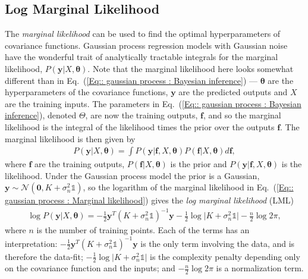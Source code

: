 \documentclass[twoside,english]{uiofysmaster}
\begin{document}
\subsection{Log Marginal Likelihood}\label{Sec:: gaussian process : Log Marginal Likelihood}

The \textit{marginal likelihood} can be used to find the optimal hyperparameters of covariance functions. Gaussian process regression models with Gaussian noise have the wonderful trait of analytically tractable integrals for the marginal likelihood, $P(\textbf{y}|X, \boldsymbol{\theta})$. Note that the marginal likelihood here looks somewhat different than in Eq.~(\ref{Eq:: gaussian process : Bayesian inference}) --- $\boldsymbol{\theta}$ are the hyperparameters of the covariance functions, $\textbf{y}$ are the predicted outputs and $X$ are the training inputs. The parameters in Eq.~(\ref{Eq:: gaussian process : Bayesian inference}), denoted $\Theta$, are now the training outputs, $\textbf{f}$, and so the marginal likelihood is the integral of the likelihood times the prior over the outputs $\textbf{f}$. The marginal likelihood is then given by
\begin{align}\label{Eq:: gaussian process : Marginal likelihood}
P(\textbf{y} | X, \boldsymbol{\theta}) = \int P(\textbf{y}| \textbf{f}, X, \boldsymbol{\theta}) P (\textbf{f}|X, \boldsymbol{\theta})d \textbf{f},
\end{align}
where $\textbf{f}$ are the training outputs, $P(\textbf{f}|X, \boldsymbol{\theta})$ is the prior and $P(\textbf{y}|\textbf{f},X, \boldsymbol{\theta})$ is the likelihood. Under the Gaussian process model the prior is a Gaussian, $\textbf{y} \sim \mathcal{N}(\textbf{0}, K + \sigma^2_n \mathbb{1})$, so the logarithm of the marginal likelihood in Eq.~(\ref{Eq:: gaussian process : Marginal likelihood}) gives the \textit{log marginal likelihood} (LML) \cite{rasmussen2006gaussian} 
\begin{align}\label{Eq:: gaussian process : LML gaussian process}
\log P(\textbf{y}|X, \boldsymbol{\theta}) = - \frac{1}{2} \textbf{y}^T (K + \sigma_n^2 \mathbb{1})^{-1} \textbf{y} - \frac{1}{2} \log \big|K + \sigma_n^2 \mathbb{1}\big| - \frac{n}{2} \log 2 \pi,
\end{align}
where $n$ is the number of training points. Each of the terms has an interpretation: $- \frac{1}{2} \textbf{y}^T (K + \sigma_n^2 \mathbb{1})^{-1} \textbf{y}$ is the only term involving the data, and is therefore the data-fit; $-\frac{1}{2} \log \big| K + \sigma_n^2 \mathbb{1} \big|$ is the complexity penalty depending only on the covariance function and the inputs; and $- \frac{n}{2} \log 2 \pi$ is a normalization term. 
\end{document}
